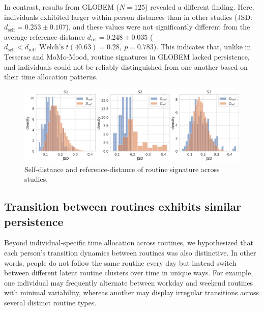 \documentclass[pdflatex,sn-vancouver,Numbered]{bst/sn-jnl}%
\theoremstyle{thmstyleone}%
\theoremstyle{thmstyletwo}%
\theoremstyle{thmstylethree}%
\newcommand{\dself}[2]{$d_{\text{self}} = #1 \pm #2$}
\newcommand{\dref}[2]{$d_{\text{ref}} = #1 \pm #2$}
\newcommand{\dselfdrefp}[3]{$d_{\text{self}} < d_{\text{ref}},\ \text{Welch's } t(#1) = #2,\ p = #3$}
\newcommand{\dselfdrefpl}[3]{$d_{\text{self}} < d_{\text{ref}},\ \text{Welch's } t(#1) = #2,\ p < #3$}
\begin{document}
In contrast, results from GLOBEM (\(N=125\)) revealed a different finding. Here, individuals exhibited larger within-person distances than in other studies (JSD: \dself{0.253}{0.107}), and these values were not significantly different from the average reference distance \dref{0.248}{0.035} (\dselfdrefp{40.63}{0.28}{0.783}). This indicates that, unlike in Tesserae and MoMo-Mood, routine signatures in GLOBEM lacked persistence, and individuals could not be reliably distinguished from one another based on their time allocation patterns.

\begin{figure}
    \centering
    \includegraphics[width=1\linewidth]{figures/combined_dself_dref_ranked_jsd.png}
    \caption{Self-distance and reference-distance of routine signature across studies.}
    \label{fig:dself_dref}
\end{figure}

\subsection*{Transition between routines exhibits similar persistence}

Beyond individual-specific time allocation across routines, we hypothesized that each person’s transition dynamics between routines was also distinctive. In other words, people do not follow the same routine every day but instead switch between different latent routine clusters over time in unique ways. For example, one individual may frequently alternate between workday and weekend routines with minimal variability, whereas another may display irregular transitions across several distinct routine types.
\end{document}
